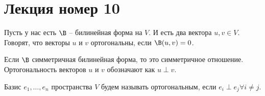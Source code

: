 \section{Лекция номер 10}
\begin{conj}
    Пусть у нас есть $\B$ -- билинейная форма на $V$. И есть два вектора $u, v \in V$. Говорят, что векторы 
    $u$ и $v$ ортогональны, если $\B(u, v) = 0$.
\end{conj}

Если $\B$ симметричная билинейная форма, то это симметричное отношение.
Ортогональность векторов $u$ и $v$ обозначают как $u \perp v$.

\begin{conj}
    Базис $e_1, \dots, e_n$ пространства $V$ будем называть ортогональным, если $e_i \perp e_j \forall i \neq j$. 
\end{conj}

